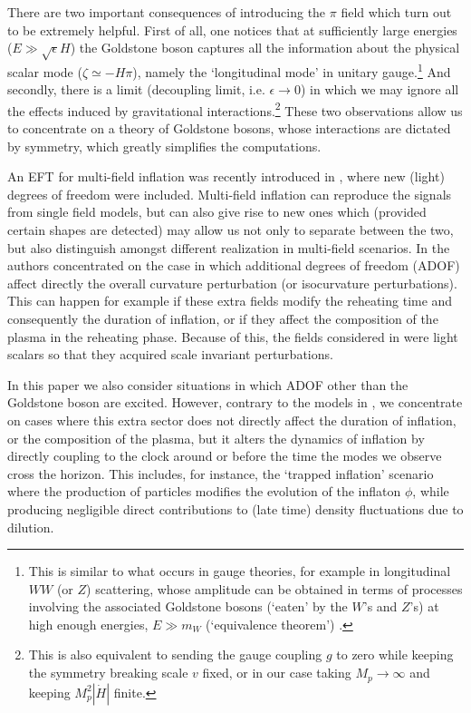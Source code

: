 \documentclass[11pt,amsmath,floats,floatfix,nofootinbib,secnumarabic, superscriptaddress, tightenlines]{revtex4}
\begin{document}
There are two important consequences of introducing the $\pi$ field which turn out to be extremely helpful. First of all, one notices that at sufficiently large energies ($E \gg \sqrt{\epsilon} H$) the Goldstone boson captures all the information about the physical scalar mode ($\zeta\simeq-H\pi$), namely the `longitudinal mode' in unitary gauge.\footnote{This is similar to what occurs in gauge theories, for example in longitudinal $WW$ (or $Z$) scattering, whose amplitude can be obtained in terms of processes involving the associated Goldstone bosons (`eaten' by the $W$'s and $Z$'s) at high enough energies, $E \gg m_W$ (`equivalence theorem') \cite{peskin, ben}.} And secondly, there is a limit (decoupling limit, i.e. $\epsilon \to 0$) in which we may ignore all the effects induced by gravitational interactions.\footnote{This is also equivalent to sending the gauge coupling $g$ to zero while keeping the symmetry breaking scale $v$ fixed, or in our case taking $M_p\to \infty$ and keeping $M_p^2|\dot H|$ finite.} These two observations allow us to concentrate on a theory of Goldstone bosons, whose interactions are dictated by symmetry, which greatly simplifies the computations.

An EFT for multi-field inflation was recently introduced in \cite{multieft}, where new (light) degrees of freedom were included. Multi-field inflation can reproduce the signals from single field models, but can also give rise to new ones which (provided certain shapes are detected) may allow us not only to separate between the two, but also distinguish amongst different realization in multi-field scenarios. In \cite{multieft} the authors concentrated on the case in which additional degrees of freedom (ADOF) affect directly the overall curvature perturbation (or isocurvature perturbations). This can happen for example if these extra fields modify the reheating time and consequently the duration of inflation, or if they affect the composition of the plasma in the reheating phase. Because of this, the fields considered in \cite{multieft} were light scalars so that they acquired scale invariant perturbations.

In this paper we also consider situations in which ADOF other than the Goldstone boson are excited. However, contrary to the models in \cite{multieft}, we concentrate on cases where this extra sector does not directly affect the duration of inflation, or the composition of the plasma, but it alters the dynamics of inflation by directly coupling to the clock around or before the time the modes we observe cross the horizon. This includes, for instance, the `trapped inflation' scenario \cite{trapped} where the production of particles modifies the evolution of the inflaton $\phi$, while producing negligible direct contributions to (late time) density fluctuations due to dilution.
\end{document}
